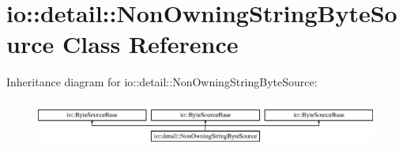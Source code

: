 \hypertarget{classio_1_1detail_1_1_non_owning_string_byte_source}{}\section{io\+:\+:detail\+:\+:Non\+Owning\+String\+Byte\+Source Class Reference}
\label{classio_1_1detail_1_1_non_owning_string_byte_source}
Inheritance diagram for io\+:\+:detail\+:\+:Non\+Owning\+String\+Byte\+Source\+:\begin{figure}[H]
\begin{center}
\leavevmode
\includegraphics[height=1.575246cm]{d1/d23/classio_1_1detail_1_1_non_owning_string_byte_source}
\end{center}
\end{figure}
